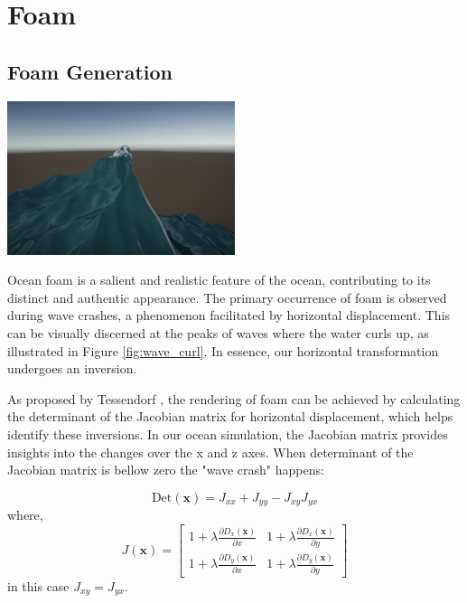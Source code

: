 

\section{Foam}

\subsection{Foam Generation}
\begin{minipage}{1\textwidth}
    \centering
    \includegraphics[width=0.50\textwidth]{"images/wave_curl.png"}
    \label{fig:wave_curl}
\end{minipage}

Ocean foam is a salient and realistic feature of the ocean, contributing to its distinct and authentic appearance. The primary occurrence of foam is observed during wave crashes, a phenomenon facilitated by horizontal displacement. This can be visually discerned at the peaks of waves where the water curls up, as illustrated in Figure \ref{fig:wave_curl}. In essence, our horizontal transformation undergoes an inversion.

As proposed by Tessendorf \cite{tessendorf2001}, the rendering of foam can be achieved by calculating the determinant of the Jacobian matrix for horizontal displacement, which helps identify these inversions. In our ocean simulation, the Jacobian matrix provides insights into the changes over the x and z axes. When determinant of the Jacobian matrix is bellow zero the "wave crash" happens:

\begin{equation}
    \text{Det}(\mathbf{x}) = J_{xx} + J_{yy} - J_{xy} J_{yx}
\end{equation}
where,
\begin{equation}
    J(\mathbf{x}) = 
    \begin{bmatrix} 
        1 + \lambda\frac{\partial D_x(\mathbf{x})}{\partial x} & 1 + \lambda\frac{\partial D_x(\mathbf{x})}{\partial y} \\
        1 + \lambda\frac{\partial D_y(\mathbf{x})}{\partial x} & 1 + \lambda\frac{\partial D_y(\mathbf{x})}{\partial y} 
    \end{bmatrix} 
\end{equation}
in this case $J_{xy} = J_{yx}$.

